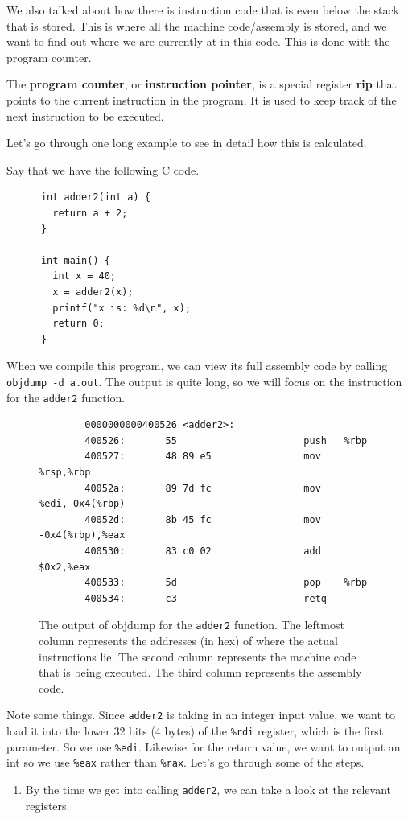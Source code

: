   We also talked about how there is instruction code that is even below the stack that is stored. This is where all the machine code/assembly is stored, and we want to find out where we are currently at in this code. This is done with the program counter. 

  \begin{definition} 
    The \textbf{program counter}, or \textbf{instruction pointer}, is a special register \textbf{rip} that points to the current instruction in the program. It is used to keep track of the next instruction to be executed.
  \end{definition}

  Let's go through one long example to see in detail how this is calculated. 
  
  \begin{example}
    Say that we have the following C code. 
    \begin{lstlisting}
      int adder2(int a) {
        return a + 2; 
      }

      int main() {
        int x = 40; 
        x = adder2(x); 
        printf("x is: %d\n", x);
        return 0; 
      }
    \end{lstlisting}
    When we compile this program, we can view its full assembly code by calling \texttt{objdump -d a.out}. The output is quite long, so we will focus on the instruction for the \texttt{adder2} function. 
    \begin{figure}[H]
      \centering 
      \begin{lstlisting}
        0000000000400526 <adder2>:
        400526:       55                      push   %rbp
        400527:       48 89 e5                mov    %rsp,%rbp
        40052a:       89 7d fc                mov    %edi,-0x4(%rbp)
        40052d:       8b 45 fc                mov    -0x4(%rbp),%eax
        400530:       83 c0 02                add    $0x2,%eax
        400533:       5d                      pop    %rbp
        400534:       c3                      retq
      \end{lstlisting}
      \caption{The output of objdump for the \texttt{adder2} function. The leftmost column represents the addresses (in hex) of where the actual instructions lie. The second column represents the machine code that is being executed. The third column represents the assembly code.}
      \label{fig:adder2} 
    \end{figure}
    Note some things. Since \texttt{adder2} is taking in an integer input value, we want to load it into the lower 32 bits (4 bytes) of the \texttt{\%rdi} register, which is the first parameter. So we use \texttt{\%edi}. Likewise for the return value, we want to output an int so we use \texttt{\%eax} rather than \texttt{\%rax}. Let's go through some of the steps. 
    \begin{enumerate}
      \item By the time we get into calling \texttt{adder2}, we can take a look at the relevant registers. 


\end{enumerate}
\end{example}
